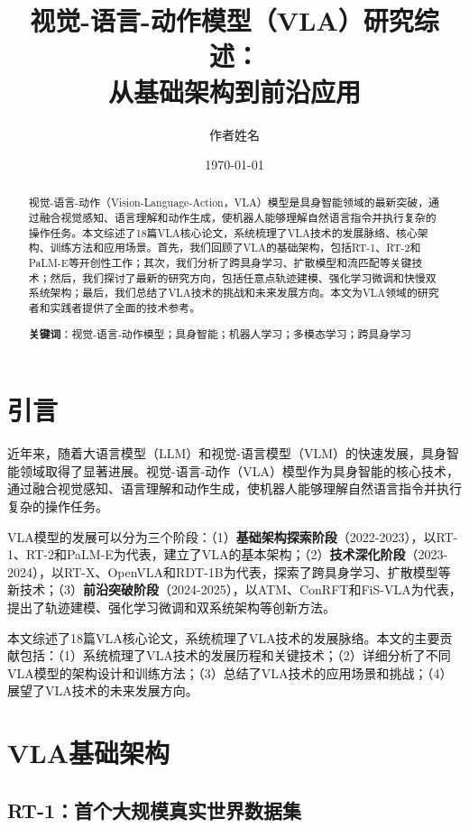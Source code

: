 \documentclass[12pt,a4paper]{article}
\title{\textbf{视觉-语言-动作模型（VLA）研究综述：\\从基础架构到前沿应用}}
\author{作者姓名}
\date{\today}
\begin{document}
\maketitle

\begin{abstract}
视觉-语言-动作（Vision-Language-Action，VLA）模型是具身智能领域的最新突破，通过融合视觉感知、语言理解和动作生成，使机器人能够理解自然语言指令并执行复杂的操作任务。本文综述了18篇VLA核心论文，系统梳理了VLA技术的发展脉络、核心架构、训练方法和应用场景。首先，我们回顾了VLA的基础架构，包括RT-1、RT-2和PaLM-E等开创性工作；其次，我们分析了跨具身学习、扩散模型和流匹配等关键技术；然后，我们探讨了最新的研究方向，包括任意点轨迹建模、强化学习微调和快慢双系统架构；最后，我们总结了VLA技术的挑战和未来发展方向。本文为VLA领域的研究者和实践者提供了全面的技术参考。

\textbf{关键词}：视觉-语言-动作模型；具身智能；机器人学习；多模态学习；跨具身学习
\end{abstract}

\section{引言}

近年来，随着大语言模型（LLM）和视觉-语言模型（VLM）的快速发展，具身智能领域取得了显著进展。视觉-语言-动作（VLA）模型作为具身智能的核心技术，通过融合视觉感知、语言理解和动作生成，使机器人能够理解自然语言指令并执行复杂的操作任务。

VLA模型的发展可以分为三个阶段：（1）\textbf{基础架构探索阶段}（2022-2023），以RT-1\cite{rt1}、RT-2\cite{rt2}和PaLM-E\cite{palme}为代表，建立了VLA的基本架构；（2）\textbf{技术深化阶段}（2023-2024），以RT-X\cite{rtx}、OpenVLA\cite{openvla}和RDT-1B\cite{rdt1b}为代表，探索了跨具身学习、扩散模型等新技术；（3）\textbf{前沿突破阶段}（2024-2025），以ATM\cite{atm}、ConRFT\cite{conrft}和FiS-VLA\cite{fisvla}为代表，提出了轨迹建模、强化学习微调和双系统架构等创新方法。

本文综述了18篇VLA核心论文，系统梳理了VLA技术的发展脉络。本文的主要贡献包括：（1）系统梳理了VLA技术的发展历程和关键技术；（2）详细分析了不同VLA模型的架构设计和训练方法；（3）总结了VLA技术的应用场景和挑战；（4）展望了VLA技术的未来发展方向。

\section{VLA基础架构}

\subsection{RT-1：首个大规模真实世界数据集}
\end{document}
